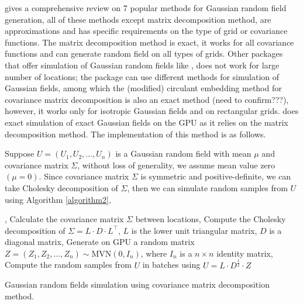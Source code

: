 \documentclass[article,nojss]{jss}\usepackage[]{graphicx}\usepackage[]{color}
\begin{document}
\cite{LiuandLi2019} gives a comprehensive review on 7 popular methods for Gaussian random field generation, %
all of these methods except matrix decomposition method, are approximations and has specific requirements on the type of grid or covariance functions. The matrix decomposition method is exact, it works for all covariance functions and can generate random field on all types of grids. Other  packages that offer simulation of Gaussian random fields like  \citep{geoR2001}, does not work for large number of locations; the  \citep{RandomFields2015,RandomFields2020} package can use different methods for simulation of Gaussian fields, among which the (modified) circulant embedding method \citep{Dietrich1997FastAE} for covariance matrix decomposition is also an exact method (need to confirm???), however, it works only for isotropic Gaussian fields and on rectangular grids.  does exact simulation of exact Gaussian fields on the GPU as it relies on the matrix decomposition method. The implementation of this method is as follows.


Suppose $U=(U_1, U_2, \dots, U_n)$ is a Gaussian random field with mean $\mu$ and covariance matrix $\Sigma$, without loss of generality, we assume mean value zero $(\mu = 0)$. Since covariance matrix $\Sigma$ is symmetric and positive-definite, we can take Cholesky decomposition of $\Sigma$, then we can simulate random samples from $U$ using Algorithm \ref{algorithm2},

\begin{algorithm*}[H] \label{algorithm2}
, Calculate the covariance matrix $\Sigma$ between locations, Compute the Cholesky decomposition of $\Sigma = L \cdot D \cdot L^\top$, $L$ is the lower unit triangular matrix, $D$ is a diagonal matrix, Generate on GPU a random matrix $Z=(Z_1, Z_2, \dots, Z_n) \sim \text{MVN}(0,I_n)$, where $I_n$ is a $n \times n$ identity matrix, Compute the random samples from $U$ in batches using $U = L \cdot D^{\frac{1}{2}} \cdot Z$ \;
 \caption{Gaussian random fields simulation using covariance matrix decomposition method.}
\end{algorithm*}
\end{document}
